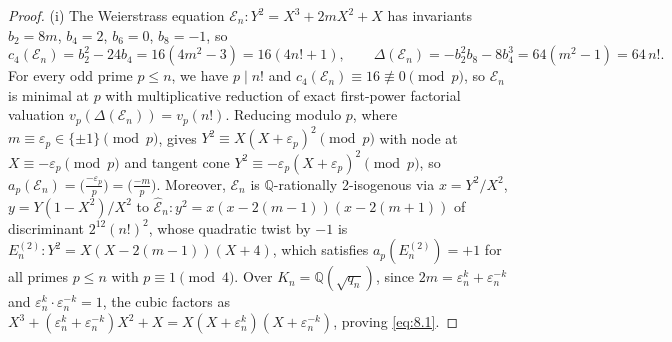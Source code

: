 \documentclass[11pt,reqno]{amsart}
\theoremstyle{remark}
\numberwithin{equation}{section}
\newcommand{\Q}{\mathbb{Q}}
\begin{document}
\begin{proof}
(i) The Weierstrass equation $\mathcal{E}_n : Y^2 = X^3 + 2mX^2 + X$ has invariants $b_2 = 8m$, $b_4 = 2$, $b_6 = 0$, $b_8 = -1$, so
\[
c_4(\mathcal{E}_n) = b_2^2 - 24b_4 = 16(4m^2 - 3) = 16(4n! + 1), \qquad \Delta(\mathcal{E}_n) = -b_2^2 b_8 - 8b_4^3 = 64(m^2 - 1) = 64\,n!.
\]
For every odd prime $p \le n$, we have $p \mid n!$ and $c_4(\mathcal{E}_n) \equiv 16 \not\equiv 0 \pmod p$, so $\mathcal{E}_n$ is minimal at $p$ with multiplicative reduction of exact first-power factorial valuation $v_p(\Delta(\mathcal{E}_n)) = v_p(n!)$. Reducing modulo $p$, where $m \equiv \varepsilon_p \in \{\pm 1\} \pmod p$, gives $Y^2 \equiv X(X + \varepsilon_p)^2 \pmod p$ with node at $X \equiv -\varepsilon_p \pmod p$ and tangent cone $Y^2 \equiv -\varepsilon_p(X + \varepsilon_p)^2 \pmod p$, so $a_p(\mathcal{E}_n) = \bigl(\frac{-\varepsilon_p}{p}\bigr) = \bigl(\frac{-m}{p}\bigr)$. Moreover, $\mathcal{E}_n$ is $\Q$-rationally 2-isogenous via $x = Y^2/X^2$, $y = Y(1 - X^2)/X^2$ to $\widehat{\mathcal{E}}_n : y^2 = x(x - 2(m - 1))(x - 2(m + 1))$ of discriminant $2^{12}(n!)^2$, whose quadratic twist by $-1$ is $E_n^{(2)} : Y^2 = X(X - 2(m - 1))(X + 4)$, which satisfies $a_p(E_n^{(2)}) = +1$ for all primes $p \le n$ with $p \equiv 1 \pmod 4$. Over $K_n = \Q(\sqrt{q_n})$, since $2m = \varepsilon_n^k + \varepsilon_n^{-k}$ and $\varepsilon_n^k \cdot \varepsilon_n^{-k} = 1$, the cubic factors as $X^3 + (\varepsilon_n^k + \varepsilon_n^{-k})X^2 + X = X(X + \varepsilon_n^k)(X + \varepsilon_n^{-k})$, proving \eqref{eq:8.1}.


\end{proof}
\end{document}

